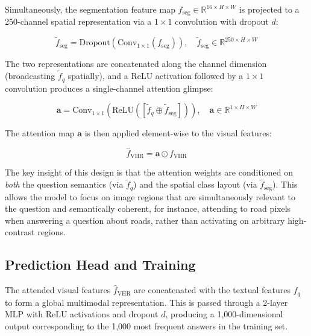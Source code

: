 Simultaneously, the segmentation feature map
$f_\text{seg} \in \mathbb{R}^{16 \times H \times W}$ is
projected to a 250-channel spatial representation via a
$1 \times 1$ convolution with dropout $d$:

\begin{equation}
    \tilde{f}_\text{seg} = \text{Dropout}(\text{Conv}_{1
    \times 1}(f_\text{seg})),
    \quad \tilde{f}_\text{seg} \in \mathbb{R}^{250 \times
    H \times W}
\end{equation}

The two representations are concatenated along the channel
dimension (broadcasting $\tilde{f}_q$ spatially), and a
ReLU activation followed by a $1 \times 1$ convolution
produces a single-channel attention glimpse:

\begin{equation}
    \mathbf{a} = \text{Conv}_{1 \times 1}\left(
    \text{ReLU}\left([\tilde{f}_q \oplus
    \tilde{f}_\text{seg}]\right)\right),
    \quad \mathbf{a} \in \mathbb{R}^{1 \times H \times W}
\end{equation}

The attention map $\mathbf{a}$ is then applied element-wise
to the visual features:

\begin{equation}
    \hat{f}_\text{VHR} = \mathbf{a} \odot f_\text{VHR}
\end{equation}

The key insight of this design is that the attention weights
are conditioned on \textit{both} the question semantics
(via $\tilde{f}_q$) and the spatial class layout (via
$\tilde{f}_\text{seg}$). This allows the model to focus
on image regions that are simultaneously relevant to the
question and semantically coherent, for instance,
attending to road pixels when answering a question about
roads, rather than activating on arbitrary high-contrast
regions.

\subsection{Prediction Head and Training}
\label{sec:chap4_method_prediction}

The attended visual features $\hat{f}_\text{VHR}$ are
concatenated with the textual features $f_q$ to form a
global multimodal representation. This is passed through
a 2-layer MLP with ReLU activations and dropout $d$,
producing a 1,000-dimensional output corresponding to the
1,000 most frequent answers in the training set.

